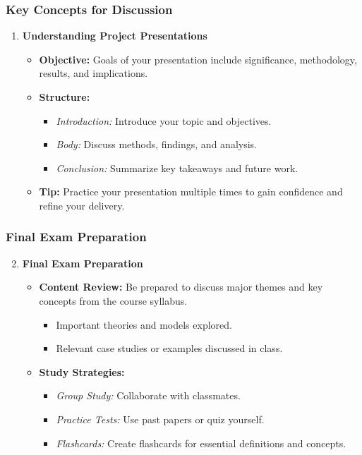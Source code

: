 \documentclass[aspectratio=169]{beamer}
\begin{document}
\begin{frame}[fragile]
    \frametitle{Key Concepts for Discussion}
    \begin{enumerate}
        \item \textbf{Understanding Project Presentations}
        \begin{itemize}
            \item \textbf{Objective:} Goals of your presentation include significance, methodology, results, and implications.
            \item \textbf{Structure:}
            \begin{itemize}
                \item \textit{Introduction:} Introduce your topic and objectives.
                \item \textit{Body:} Discuss methods, findings, and analysis.
                \item \textit{Conclusion:} Summarize key takeaways and future work.
            \end{itemize}
            \item \textbf{Tip:} Practice your presentation multiple times to gain confidence and refine your delivery.
        \end{itemize}
    \end{enumerate}
\end{frame}

\begin{frame}[fragile]
    \frametitle{Final Exam Preparation}
    \begin{enumerate}
        \setcounter{enumi}{1} %
        \item \textbf{Final Exam Preparation}
        \begin{itemize}
            \item \textbf{Content Review:} Be prepared to discuss major themes and key concepts from the course syllabus.
            \begin{itemize}
                \item Important theories and models explored.
                \item Relevant case studies or examples discussed in class.
            \end{itemize}
            \item \textbf{Study Strategies:}
            \begin{itemize}
                \item \textit{Group Study:} Collaborate with classmates.
                \item \textit{Practice Tests:} Use past papers or quiz yourself.
                \item \textit{Flashcards:} Create flashcards for essential definitions and concepts.
            \end{itemize}
        \end{itemize}
    \end{enumerate}
\end{frame}
\end{document}
